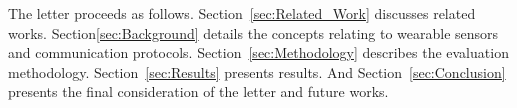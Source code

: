 The letter proceeds as follows. Section~\ref{sec:Related_Work} discusses related works. Section\ref{sec:Background} details the concepts relating to wearable sensors and communication protocols. Section~\ref{sec:Methodology} describes the evaluation methodology. Section~\ref{sec:Results} presents results. And Section~\ref{sec:Conclusion} presents the final consideration of the letter and future works.